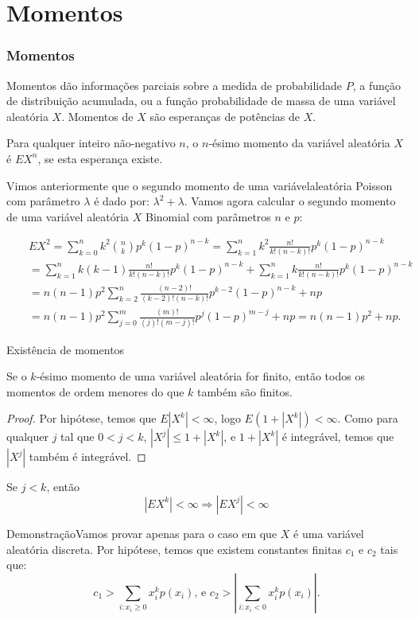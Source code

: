 \section{Momentos}
\begin{frame}
\frametitle{Momentos}
%
Momentos dão informações parciais sobre a medida de probabilidade
$P$, a função de distribuição acumulada, ou a função probabilidade
de massa de uma variável aleatória $X$. Momentos de $X$ são
esperanças de potências de $X$.
%
\begin{defi}
Para qualquer inteiro não-negativo $n$, o $n$-ésimo momento da
variável aleatória $X$ é $EX^n$, se esta esperança existe.
\end{defi}
%
Vimos anteriormente que o segundo momento de uma variávelaleatória Poisson com parâmetro $\lambda$ é dado por: $\lambda^2+\lambda$. Vamos agora calcular o segundo momento de uma variável aleatória $X$ Binomial com parâmetros $n$ e $p$:

\begin{eqnarray}
& &
EX^2=\sum_{k=0}^{n}k^2\binom{n}{k}p^k(1-p)^{n-k}=\sum_{k=1}^{n}k^2\frac{n!}{k!(n-k)!}p^k(1-p)^{n-k}\nonumber\\
& & =\sum_{k=1}^{n}k(k-1)\frac{n!}{k!(n-k)!}p^k(1-p)^{n-k}+\sum_{k=1}^{n}k\frac{n!}{k!(n-k)!}p^k(1-p)^{n-k}\nonumber\\
& & =n(n-1)p^2\sum_{k=2}^{n}\frac{(n-2)!}{(k-2)!(n-k)!}p^{k-2}(1-p)^{n-k}+np\nonumber\\
& & =n(n-1)p^2\sum_{j=0}^{m}\frac{(m)!}{(j)!(m-j)!}p^{j}(1-p)^{m-j}+np=n(n-1)p^2+np.\nonumber
\end{eqnarray}

\end{frame}
%
\begin{frame}{Existência de momentos}
%
%
\begin{teo}
Se o $k$-ésimo momento de uma variável aleatória for finito, então todos os momentos de ordem menores do que $k$ também são finitos.
\end{teo}
%
\begin{proof}
Por hipótese, temos que $E|X^k|<\infty$, logo $E(1+|X^{k}|)<\infty$. Como para qualquer $j$ tal que $0<j<k$, $|X^{j}|\leq 1+|X^{k}|$, e $1+|X^{k}|$ é integrável, temos que $|X^{j}|$ também é integrável.
\end{proof}
%
\begin{teo}Se $j<k$, então $$|EX^k|<\infty\Rightarrow |EX^j|<\infty$$
\end{teo}

\begin{block}{Demonstração}Vamos provar apenas para o caso em que $X$ é uma variável
aleatória discreta. Por hipótese, temos que existem constantes
finitas $c_1$ e $c_2$ tais que:
$$c_1>\sum_{i:x_i\geq 0}x_i^kp(x_i)\mbox{, e }c_2>|\sum_{i:x_i<0}x_i^kp(x_i)|.$$

\end{block}
\end{frame}

